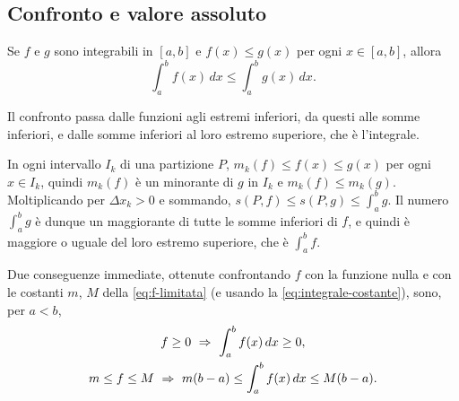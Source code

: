 \subsection{Confronto e valore assoluto}

\begin{teorema}\label{teo:confronto-integrali}
Se $f$ e $g$ sono integrabili in $[a,b]$ e $f(x)\le g(x)$ per ogni $x\in[a,b]$, allora
\begin{equation}\label{eq:confronto-integrali}
  \int_{a}^{b}f(x)\,dx\le\int_{a}^{b}g(x)\,dx .
\end{equation}
\end{teorema}

\begin{schema}
\end{schema}

\begin{strategia}
Il confronto passa dalle funzioni agli estremi inferiori, da questi alle somme
inferiori, e dalle somme inferiori al loro estremo superiore, che è l'integrale.
\end{strategia}

\begin{dimostrazione}
In ogni intervallo $I_{k}$ di una partizione $P$, $m_{k}(f)\le f(x)\le g(x)$ per ogni
$x\in I_{k}$, quindi $m_{k}(f)$ è un minorante di $g$ in $I_{k}$ e $m_{k}(f)\le m_{k}(g)$.
Moltiplicando per $\Delta x_{k}>0$ e sommando, $s(P,f)\le s(P,g)\le\int_{a}^{b}g$. Il numero
$\int_{a}^{b}g$ è dunque un maggiorante di tutte le somme inferiori di $f$, e quindi è
maggiore o uguale del loro estremo superiore, che è $\int_{a}^{b}f$.
\end{dimostrazione}

Due conseguenze immediate, ottenute confrontando $f$ con la funzione nulla e con le
costanti $m$, $M$ della \eqref{eq:f-limitata} (e usando la \eqref{eq:integrale-costante}),
sono, per $a<b$,
\begin{equation}\label{eq:positivita-stima}
\begin{gathered}
  f\ge0 \ \Rightarrow\ \int_{a}^{b}f(x)\,dx\ge0,\\
  m\le f\le M \ \Rightarrow\ m(b-a)\le\int_{a}^{b}f(x)\,dx\le M(b-a) .
\end{gathered}
\end{equation}

